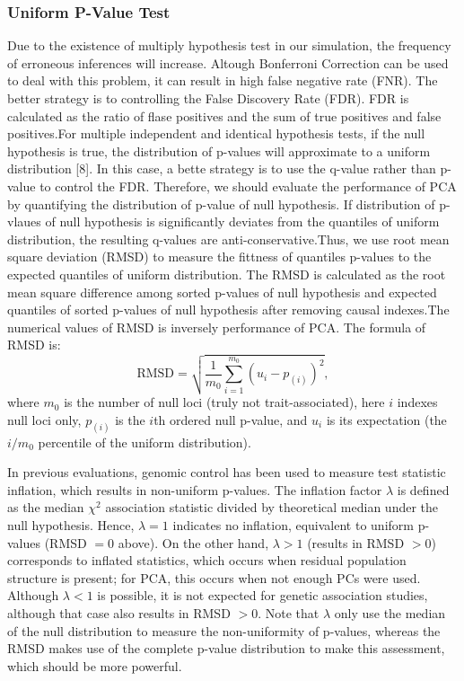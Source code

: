 \documentclass[12pt]{article}
\begin{document}
\subsubsection{Uniform P-Value Test }
Due to the existence of multiply hypothesis test in our simulation, the frequency of erroneous inferences will increase. Altough Bonferroni Correction can be used to deal with this problem, it can result in high false negative rate (FNR). The better strategy is to controlling the False Discovery Rate (FDR). FDR is calculated as the ratio of flase positives and the sum of true positives and false positives.For multiple independent and identical hypothesis tests, if the null hypothesis is true, the distribution of p-values will approximate to a uniform distribution [8]. In this case, a bette strategy is to use the q-value rather than p-value to control the FDR. Therefore, we should evaluate the performance of PCA by quantifying the distribution of p-value of null hypothesis. If distribution of p-vlaues of null hypothesis is significantly deviates from the quantiles of uniform distribution, the resulting q-values are anti-conservative.Thus, we use root mean square deviation (RMSD) to measure the fittness of quantiles p-values to the expected quantiles of uniform distribution. The RMSD is calculated as the root mean square difference among sorted p-values of null hypothesis and expected quantiles of sorted p-values of null hypothesis after removing causal indexes.The numerical values of RMSD is inversely  performance of PCA. The formula of RMSD is:
$$
\text{RMSD}
=
\sqrt{ \frac{1}{m_0} \sum_{i = 1}^{m_0} \left( u_i - p_{(i)} \right)^2 },
$$
where
$m_0$ is the number of null loci (truly not trait-associated),
here $i$ indexes null loci only,
$p_{(i)}$ is the $i$th ordered null p-value, and
$u_i$ is its expectation (the $i/m_0$ percentile of the uniform distribution).

In previous evaluations, genomic control has been used to measure test statistic inflation, which results in non-uniform p-values.
The inflation factor $\lambda$ is defined as the median $\chi^2$ association statistic divided by theoretical median under the null hypothesis.
Hence, $\lambda = 1$ indicates no inflation, equivalent to uniform p-values (RMSD $ = 0$ above).
On the other hand, $\lambda > 1$ (results in RMSD $ > 0$) corresponds to inflated statistics, which occurs when residual population structure is present;
for PCA, this occurs when not enough PCs were used.
Although $\lambda < 1$ is possible, it is not expected for genetic association studies, although that case also results in RMSD $ > 0$.
Note that $\lambda$ only use the median of the null distribution to measure the non-uniformity of p-values, whereas the RMSD makes use of the complete p-value distribution to make this assessment, which should be more powerful.
\end{document}
